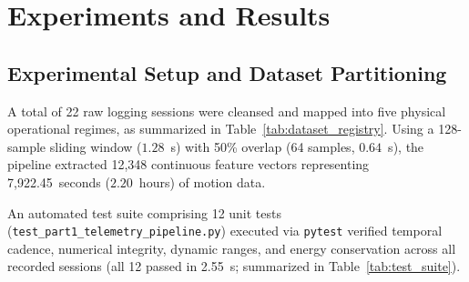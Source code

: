 \documentclass[twocolumn]{article}
\begin{document}
\section{Experiments and Results}

\subsection{Experimental Setup and Dataset Partitioning}
A total of 22 raw logging sessions were cleansed and mapped into five physical operational regimes, as summarized in Table~\ref{tab:dataset_registry}. Using a 128-sample sliding window ($1.28$~s) with 50\% overlap (64 samples, $0.64$~s), the pipeline extracted 12,348 continuous feature vectors representing 7,922.45~seconds ($2.20$~hours) of motion data.



An automated test suite comprising 12 unit tests (\texttt{test\_part1\_telemetry\_pipeline.py}) executed via \texttt{pytest} verified temporal cadence, numerical integrity, dynamic ranges, and energy conservation across all recorded sessions (all 12 passed in 2.55~s; summarized in Table~\ref{tab:test_suite}).
\end{document}
